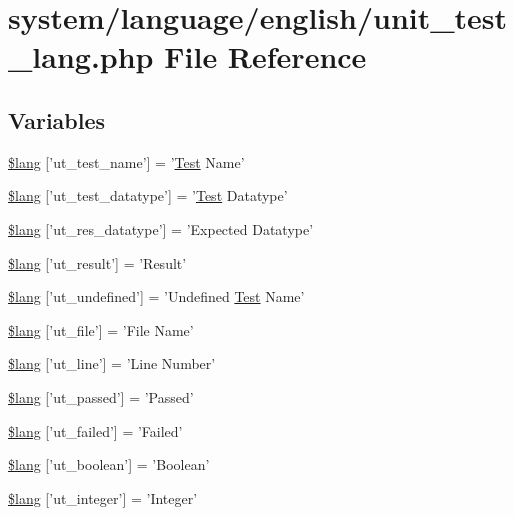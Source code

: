 \hypertarget{unit__test__lang_8php}{\section{system/language/english/unit\-\_\-test\-\_\-lang.php File Reference}
\label{unit__test__lang_8php}
}
\subsection*{Variables}
\begin{DoxyCompactItemize}
\item 
\hyperlink{unit__test__lang_8php_ad25baa7cab208cbe1fbe6f6913b0e18c}{\$lang} \mbox{[}'ut\-\_\-test\-\_\-name'\mbox{]} = '\hyperlink{class_test}{Test} Name'
\item 
\hyperlink{unit__test__lang_8php_a141cfe44ef46b61362f161bc0cf220bc}{\$lang} \mbox{[}'ut\-\_\-test\-\_\-datatype'\mbox{]} = '\hyperlink{class_test}{Test} Datatype'
\item 
\hyperlink{unit__test__lang_8php_a104083e98991c97a0ffa647a05541146}{\$lang} \mbox{[}'ut\-\_\-res\-\_\-datatype'\mbox{]} = 'Expected Datatype'
\item 
\hyperlink{unit__test__lang_8php_a01f12785712ee32a97dc53d85e226993}{\$lang} \mbox{[}'ut\-\_\-result'\mbox{]} = 'Result'
\item 
\hyperlink{unit__test__lang_8php_a08d38874ed86b9368f126d7597801077}{\$lang} \mbox{[}'ut\-\_\-undefined'\mbox{]} = 'Undefined \hyperlink{class_test}{Test} Name'
\item 
\hyperlink{unit__test__lang_8php_aadb1d48c93ccef9a1f4e61d529f8ee80}{\$lang} \mbox{[}'ut\-\_\-file'\mbox{]} = 'File Name'
\item 
\hyperlink{unit__test__lang_8php_aee353ee43b856ce5ec790a20ea15ef92}{\$lang} \mbox{[}'ut\-\_\-line'\mbox{]} = 'Line Number'
\item 
\hyperlink{unit__test__lang_8php_a7b1c16415de1186d294aa317d0bc864f}{\$lang} \mbox{[}'ut\-\_\-passed'\mbox{]} = 'Passed'
\item 
\hyperlink{unit__test__lang_8php_a3aefecf7c98bec69d7957cbb673a3f49}{\$lang} \mbox{[}'ut\-\_\-failed'\mbox{]} = 'Failed'
\item 
\hyperlink{unit__test__lang_8php_aa274bf9371c9922bc530135b4dc45943}{\$lang} \mbox{[}'ut\-\_\-boolean'\mbox{]} = 'Boolean'
\item 
\hyperlink{unit__test__lang_8php_aa59dea4a9af41fde66d69436eadfd67b}{\$lang} \mbox{[}'ut\-\_\-integer'\mbox{]} = 'Integer'

\end{DoxyCompactItemize}
